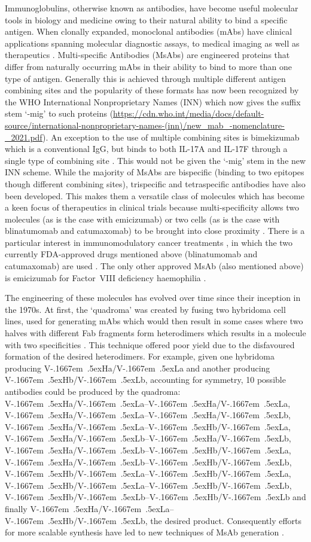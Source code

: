 \documentclass[a4]{article}
\newcommand{\VH}{\mbox{V\kern-.1667em \lower.5ex\hbox{\scriptsize H}}}
\newcommand{\VL}{\mbox{V\kern-.1667em \lower.5ex\hbox{\scriptsize L}}}
\begin{document}
Immunoglobulins, otherwise known as antibodies, have become useful molecular
tools in biology and medicine owing to their natural ability to bind a
specific antigen. When clonally expanded, monoclonal antibodies (mAbs)
have clinical applications spanning molecular diagnostic assays, to medical
imaging as well as therapeutics \cite{ma:2021}.
Multi-specific Antibodies (MsAbs) are engineered proteins
that differ from naturally occurring mAbs in their ability to bind to
more than one type of antigen. Generally this is achieved through multiple
different antigen combining sites and the popularity of these formats
has now been recognized by the WHO International Nonproprietary Names
(INN) which now gives the suffix stem `-mig' to such proteins
(\url{https://cdn.who.int/media/docs/default-source/international-nonproprietary-names-(inn)/new_mab_-nomenclature-_2021.pdf}).
An exception to the use of multiple combining sites is bimekizumab
which is a conventional IgG, but binds to both IL-17A and IL-17F
through a single type of combining site \cite{adams:bimekizumab}.
This would not be given the `-mig' stem in the new INN scheme.
While the majority of MsAbs are bispecific (binding to two epitopes though
different combining sites), 
trispecific and tetraspecific antibodies have also been developed.
This makes them a versatile class of molecules
which has become a keen focus of therapeutics in clinical trials
because multi-specificity allows two molecules (as is the case with emicizumab)
or two cells (as is the case with blinatumomab and catumaxomab)
to be brought into close proximity \cite{fan:2015}.
There is a particular interest in immunomodulatory cancer treatments
\cite{labrijn:2019}, in which the two currently FDA-approved
drugs mentioned above (blinatumomab and catumaxomab) are used
\cite{wilke:2017,seimetz:2011}. The only other approved MsAb (also mentioned
above) is emicizumab for Factor~VIII deficiency haemophilia \cite{schmitt:2021}. 

The engineering of these molecules has evolved over time since their
inception in the 1970s. At first, the `quadroma' was created by fusing two
hybridoma cell lines, used for generating mAbs which would then result
in some cases where two halves with different Fab fragments form
heterodimers which results in a molecule with two specificities
\cite{milstein:1983,kontermann:2015}. This
technique offered poor yield due to the disfavoured formation of the
desired heterodimers. For example, given one hybridoma
producing \VH{a}/\VL{a} and another producing \VH{b}/\VL{b}, accounting
for symmetry, 10 possible antibodies could be produced by the quadroma:
\VH{a}/\VL{a}--\VH{a}/\VL{a}, \VH{a}/\VL{a}--\VH{a}/\VL{b},
\VH{a}/\VL{a}--\VH{b}/\VL{a}, \VH{a}/\VL{b}--\VH{a}/\VL{b},
\VH{a}/\VL{b}--\VH{b}/\VL{a}, \VH{a}/\VL{b}--\VH{b}/\VL{b},
\VH{b}/\VL{a}--\VH{b}/\VL{a}, \VH{b}/\VL{a}--\VH{b}/\VL{b},
\VH{b}/\VL{b}--\VH{b}/\VL{b} and finally \VH{a}/\VL{a}--\VH{b}/\VL{b},
the desired product. Consequently efforts for more scalable synthesis have
led to new techniques of MsAb generation \cite{spiess:2015}. 
\end{document}
